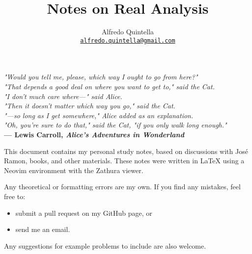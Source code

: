 \documentclass[notitlepage]{scrbook}
\title{Notes on Real Analysis}
\author{Alfredo Quintella \\\href{mailto:alfredo.quintella@gmail.com}{\texttt{alfredo.quintella@gmail.com}}}
\theoremstyle{definition}
\begin{document}
	\maketitle
  
 \vspace{2cm} %
\begin{flushright}
    \textit{
    "Would you tell me, please, which way I ought to go from here?"  
    \\
    "That depends a good deal on where you want to get to," said the Cat.  
    \\
    "I don't much care where—" said Alice.  
    \\
    "Then it doesn't matter which way you go," said the Cat.  
    \\
    "—so long as I get somewhere," Alice added as an explanation.  
    \\
    "Oh, you're sure to do that," said the Cat, "if you only walk long enough."
    }
    \\[1em]
    \textbf{— Lewis Carroll, \textit{Alice's Adventures in Wonderland}}
\end{flushright} 

  \newpage
  This document contains my personal study notes, based on discussions with José Ramon, books, and other materials. These notes were written in LaTeX using a Neovim environment with the Zathura viewer.  

  Any theoretical or formatting errors are my own. If you find any mistakes, feel free to:  
  \begin{itemize}
    \item submit a pull request on my GitHub page, or  
    \item send me an email.  
  \end{itemize}  

  Any suggestions for example problems to include are also welcome.  
  
  \tableofcontents

  \printbibliography
\end{document}
